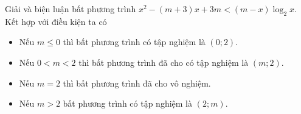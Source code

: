 \begin{bt}%
	Giải và biện luận bất phương trình $x^2-(m+3)x+3m<(m-x)\log_2 x$.
	Kết hợp với điều kiện ta có
	\begin{itemize}
		\item Nếu $m\le 0$ thì bất phương trình có tập nghiệm là $(0;2)$.
		\item Nếu $0<m<2$ thì bất phương trình đã cho có tập nghiệm là $(m;2)$.
		\item Nếu $m=2$ thì bất phương trình đã cho vô nghiệm.
		\item Nếu $m>2$ bất phương trình có tập nghiệm là $(2;m)$.
	\end{itemize}
\end{bt}

